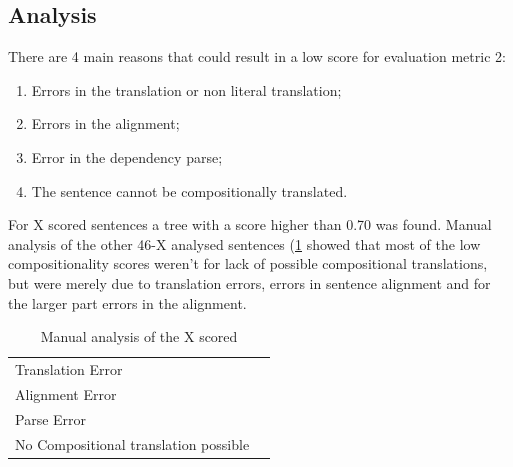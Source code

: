 \documentclass{report}
\theoremstyle{definition}
\theoremstyle{plain}
\begin{document}
\subsection{Analysis}

There are 4 main reasons that could result in a low score for evaluation metric 2:
\begin{enumerate}
\item Errors in the translation or non literal translation;
\item Errors in the alignment;
\item Error in the dependency parse;
\item The sentence cannot be compositionally translated.
\end{enumerate}

For X scored sentences a tree with a score higher than 0.70 was found. Manual analysis of the other 46-X analysed sentences (\ref{tab:class} showed that most of the low compositionality scores weren't for lack of possible compositional translations, but were merely due to translation errors, errors in sentence alignment and for the larger part errors in the alignment.

\begin{table}[!h]\label{tab:class}
\begin{tabular}{|l|l|}
\hline
Translation Error & \\
Alignment Error & \\
Parse Error &\\
No Compositional translation possible & \\
\hline
\end{tabular}
\caption{Manual analysis of the X scored}
\end{table}

%
%
%





%
%
\end{document}

